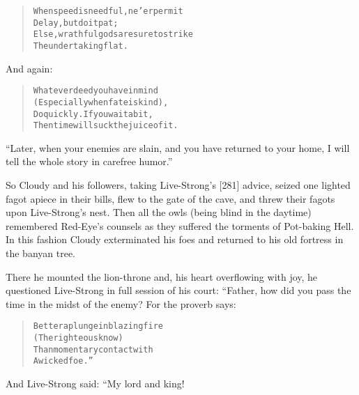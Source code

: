 \documentclass[article, twoside, 14pt]{memoir}
\renewenvironment{verbatim}{%
\begin{quote}%
\vskip -10pt%
\begin{alltt}\normalfont\large}{\end{alltt}%
\end{quote}%
\vskip -10pt
} %
\begin{document}
\begin{verbatim}
When speed is needful, ne'er permit
    Delay, but do it pat;
Else, wrathful gods are sure to strike
    The undertaking flat.
\end{verbatim}
And again:

\begin{verbatim}
Whatever deed you have in mind
(Especially when fate is kind),
Do quickly. If you wait a bit,
Then time will suck the juice of it.
\end{verbatim}
``Later, when your enemies are slain, and you have returned to your home, I will tell the whole story in carefree humor.''

So Cloudy and his followers, taking Live-Strong's [281] advice,
seized one lighted fagot apiece in their bills, flew to the gate of
the cave, and threw their fagots upon Live-Strong's nest. Then all
the owls (being blind in the daytime) remembered Red-Eye's counsels
as they suffered the torments of Pot-baking Hell. In this fashion
Cloudy exterminated his foes and returned to his old fortress in
the banyan tree.

There he mounted the lion-throne and, his heart overflowing with
joy, he questioned Live-Strong in full session of his court:
“Father, how did you pass the time in the midst of the enemy? For
the proverb says:

\begin{verbatim}
Better a plunge in blazing fire
    (The righteous know)
Than momentary contact with
    A wicked foe.”
\end{verbatim}
And Live-Strong said: “My lord and king!
\end{document}
